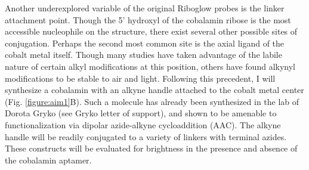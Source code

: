Another underexplored variable of the original Riboglow probes is the linker attachment point. Though the 5' hydroxyl of the cobalamin ribose is the most accessible nucleophile on the structure, there exist several other possible sites of conjugation. Perhaps the second most common site is the axial ligand of the cobalt metal itself. Though many studies have taken advantage of the labile nature of certain alkyl modifications at this position,\cite{ShellVitaminB12Tunable2015} others have found alkynyl modifications to be stable to air and light.\cite{ChrominskiReductionfreesynthesisstable2013,RuetzMarkusPhenylethynylcobalaminLightStable2013} Following this precedent, I will synthesize a cobalamin with an alkyne handle attached to the cobalt metal center (Fig. \ref{figure:aim1}B). Such a molecule has already been synthesized in the lab of Dorota Gryko (see Gryko letter of support), and shown to be amenable to functionalization via dipolar azide-alkyne cycloaddition (AAC).\cite{ChrominskiVitaminB12Derivatives2014} The alkyne handle will be readily conjugated to a variety of linkers with terminal azides. 
These constructs will be evaluated for brightness in the presence and absence of the cobalamin aptamer.


